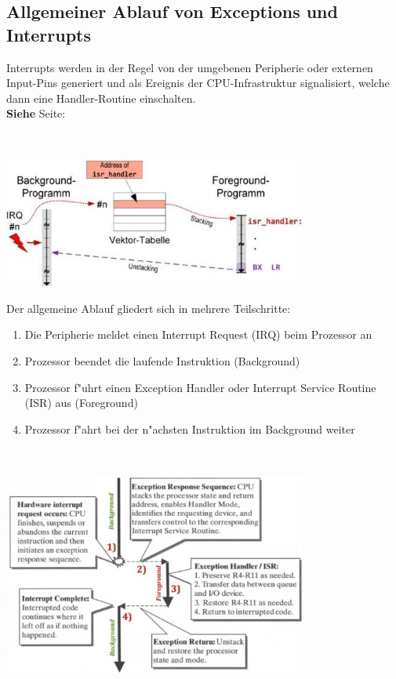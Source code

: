 \subsection{Allgemeiner Ablauf von Exceptions und Interrupts}
\begin{minipage}{8cm}
Interrupts werden in der Regel von der umgebenen Peripherie oder externen Input-Pins generiert und als Ereignis der CPU-Infrastruktur signalisiert, welche dann eine Handler-Routine einschalten. \\
	\textbf{Siehe}  Seite: \pageref{Exceptions}
\end{minipage}
%
\begin{minipage}{0.5cm}
	\-\
\end{minipage}
%
\begin{minipage}{10cm}
\includegraphics[width=10cm]{images/interruptablauf} 
\end{minipage}

\begin{minipage}{8cm}
	Der allgemeine Ablauf gliedert sich in mehrere Teilschritte:\\
	\begin{enumerate}
		\item Die Peripherie meldet einen Interrupt Request (IRQ) beim Prozessor an
		\item Prozessor beendet die laufende Instruktion (Background)
		\item Prozessor f"uhrt einen Exception Handler oder Interrupt Service Routine (ISR) aus (Foreground)
		\item Prozessor f"ahrt bei der n"achsten Instruktion im Background weiter
	\end{enumerate}
\end{minipage}
%
\begin{minipage}{0.5cm}
	\-\
\end{minipage}
%
\begin{minipage}{10cm}
	\includegraphics[width=10cm]{images/HW-Interrupt}
\end{minipage}


